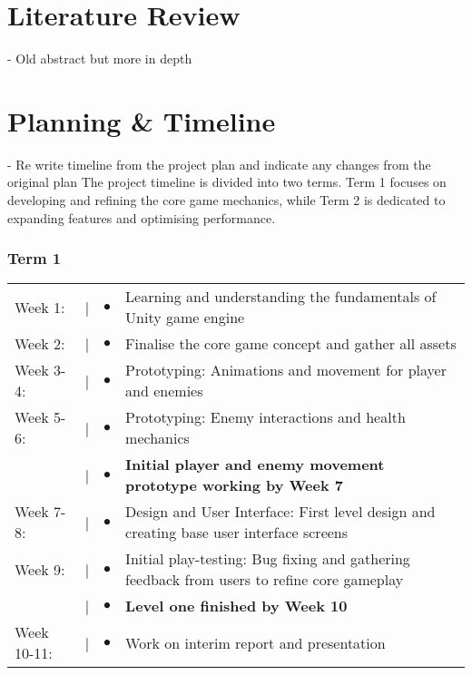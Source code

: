 \documentclass[]{final_report}
\begin{document}
\chapter{Literature Review}
- Old abstract but more in depth

\chapter{Planning \& Timeline}
- Re write timeline from the project plan and indicate any changes from the original plan
The project timeline is divided into two terms. Term 1 focuses on developing and refining the core game mechanics, while Term 2 is dedicated to expanding features and optimising performance.

\subsection{Term 1}
\begin{tabular}{@{}p{2cm}@{}>{\raggedright\arraybackslash}p{0.5cm}@{}>{\raggedright\arraybackslash}p{0.5cm}@{}p{12cm}}
Week 1: & \textcolor{black}{|} & $\bullet$ & Learning and understanding the fundamentals of Unity game engine \\
Week 2: & \textcolor{black}{|} & $\bullet$ & Finalise the core game concept and gather all assets \\
Week 3-4: & \textcolor{black}{|} & $\bullet$ & Prototyping: Animations and movement for player and enemies\\
Week 5-6: & \textcolor{black}{|} & $\bullet$ &  Prototyping: Enemy interactions and health mechanics \\
& \textcolor{black}{|} & $\bullet$ & \textbf{Initial player and enemy movement prototype working by Week 7} \\
Week 7-8: & \textcolor{black}{|} & $\bullet$ & Design and User Interface: First level design and creating base user interface screens\\
Week 9: & \textcolor{black}{|} & $\bullet$ & Initial play-testing: Bug fixing and gathering feedback from users to refine core gameplay\\
& \textcolor{black}{|} & $\bullet$ & \textbf{Level one finished by Week 10} \\
Week 10-11: & \textcolor{black}{|} & $\bullet$ & Work on interim report and presentation \\
\end{tabular}
\end{document}
